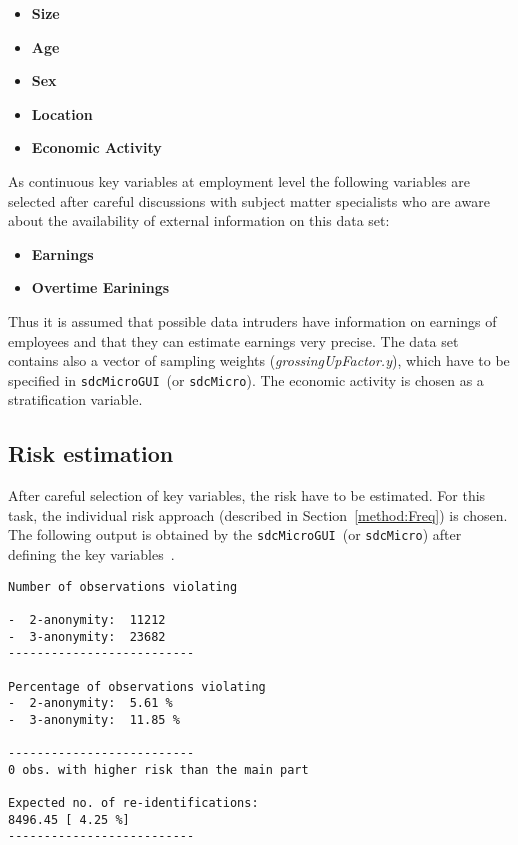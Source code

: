 \documentclass[12pt]{scrartcl}\usepackage[]{graphicx}\usepackage[]{color}
\newcommand{\sdcMicro}{\texttt{sdcMicro}}
\newcommand{\sdcMicroGUI}{\texttt{sdcMicroGUI}}
\begin{document}
\begin{itemize}
\item \textbf{Size}
\item \textbf{Age}
\item \textbf{Sex}
\item \textbf{Location}
\item \textbf{Economic Activity}
\end{itemize}

As continuous key variables at employment level the following variables are selected after careful discussions with subject matter specialists who are aware about the availability of external information on this data set:

\begin{itemize}
\item \textbf{Earnings}
\item \textbf{Overtime Earinings}
\end{itemize}

Thus it is assumed that possible data intruders have information on earnings of employees and that they can estimate earnings very precise. The data set contains also a vector of sampling weights (\textit{grossingUpFactor.y}), which have to be specified in \sdcMicroGUI \ (or \sdcMicro ). The economic activity is chosen as a stratification variable.

\subsection{Risk estimation}
After careful selection of key variables, the risk have to be estimated. For this task, the individual risk approach (described in Section~\ref{method:Freq}) is chosen. The following output is obtained by the \sdcMicroGUI \ (or \sdcMicro ) after defining the key variables~\citep[see][how to do this with the GUI]{guitutorial}.

\begin{lstlisting}[numbers=none,captionpos=b, caption={Frequency and risk estimation of the raw SES data.}, label=listing:seskey]
Number of observations violating

-  2-anonymity:  11212
-  3-anonymity:  23682
--------------------------

Percentage of observations violating
-  2-anonymity:  5.61 %
-  3-anonymity:  11.85 %

--------------------------
0 obs. with higher risk than the main part

Expected no. of re-identifications:
8496.45 [ 4.25 %]
--------------------------
\end{lstlisting}
\end{document}
